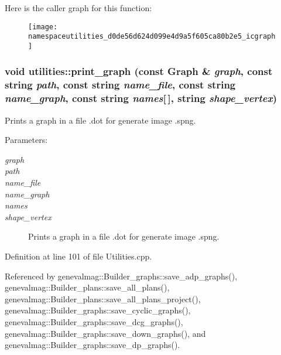 Here is the caller graph for this function:\nopagebreak
\begin{figure}[H]
\begin{center}
\leavevmode
\texttt{[image: namespaceutilities\_d0de56d624d099e4d9a5f605ca80b2e5\_icgraph]}
\end{center}
\end{figure}
\hypertarget{namespaceutilities_e0c73d526799122fa0d85cd45b6d4fbb}{
\subsubsection[{print\_\-graph}]{\setlength{\rightskip}{0pt plus 5cm}void utilities::print\_\-graph (const Graph \& {\em graph}, \/  const string {\em path}, \/  const string {\em name\_\-file}, \/  const string {\em name\_\-graph}, \/  const string {\em names}\mbox{[}$\,$\mbox{]}, \/  string {\em shape\_\-vertex})}}
\label{namespaceutilities_e0c73d526799122fa0d85cd45b6d4fbb}


Prints a graph in a file .dot for generate image .spng. \begin{Desc}
\item[Parameters:]
\begin{description}
\item[{\em graph}]\item[{\em path}]\item[{\em name\_\-file}]\item[{\em name\_\-graph}]\item[{\em names}]\item[{\em shape\_\-vertex}]Prints a graph in a file .dot for generate image .spng. \end{description}
\end{Desc}


Definition at line 101 of file Utilities.cpp.

Referenced by genevalmag::Builder\_\-graphs::save\_\-adp\_\-graphs(), genevalmag::Builder\_\-plans::save\_\-all\_\-plans(), genevalmag::Builder\_\-plans::save\_\-all\_\-plans\_\-project(), genevalmag::Builder\_\-graphs::save\_\-cyclic\_\-graphs(), genevalmag::Builder\_\-graphs::save\_\-dcg\_\-graphs(), genevalmag::Builder\_\-graphs::save\_\-down\_\-graphs(), and genevalmag::Builder\_\-graphs::save\_\-dp\_\-graphs().

